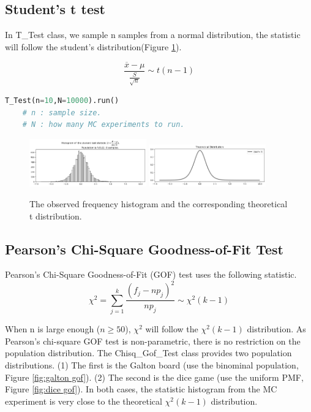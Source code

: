 \documentclass[11pt, letterpaper]{article}
\begin{document}
\subsection{Student's t test}
In T\_Test class, we sample n samples from a normal distribution, the
statistic will follow the student's distribution(Figure \ref{fig:t mc}).

\begin{equation}
    \label{deqn_ex8}
    \frac{\overline{x}-\mu}{\frac{S}{\sqrt{n}}} \sim t(n-1)
\end{equation}


\lstset{
    basicstyle=\footnotesize,
    xleftmargin=-1em,aboveskip=0.5em,belowskip=0.5em
}
\begin{lstlisting}[language=python]
    T_Test(n=10,N=10000).run()    
    # n : sample size.
    # N : how many MC experiments to run.
    \end{lstlisting}

\begin{figure}[htbp]
    \centering
    \includegraphics[width=0.45\textwidth]{fig7-t mc1.png}
    \includegraphics[width=0.45\textwidth]{fig7-t mc2.png}
    \caption{The observed frequency histogram and the corresponding theoretical t distribution.}
    \label{fig:t mc}
\end{figure}

\subsection{Pearson's Chi-Square Goodness-of-Fit Test}
Pearson's Chi-Square Goodness-of-Fit (GOF) test uses the following statistic.
\begin{equation}
    \label{deqn_ex9}
    \chi^2=\sum_{j=1}^{k}\frac{(f_{j}-np_{j})^2}{np_{j}} \sim \chi^2(k-1)
\end{equation}

When n is large enough ($n \geq 50$), $\chi^2$ will follow the $\chi^2(k-1)$ distribution.
As Pearson's chi-square GOF test is non-parametric, there is no restriction on the population distribution.
The Chisq\_Gof\_Test class provides two population distributions. (1) The first is the Galton board (use the binominal
population, Figure \ref{fig:galton gof}). (2) The second is the dice game (use the uniform PMF, Figure \ref{fig:dice gof}). In both cases,
the statistic histogram from the MC experiment is very close to the theoretical $\chi^2(k-1)$ distribution.
\end{document}
